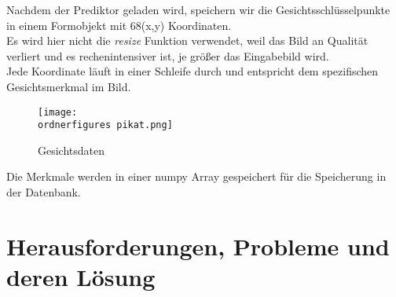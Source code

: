 \begin{flushleft}
Nachdem der Prediktor geladen wird, speichern wir die Gesichtsschlüsselpunkte in einem Formobjekt
mit 68(x,y) Koordinaten. \\
Es wird hier nicht die \textit{resize} Funktion verwendet, weil das Bild an Qualität verliert
und es rechenintensiver ist, je größer das Eingabebild wird. \\
Jede Koordinate läuft in einer Schleife durch und entspricht dem spezifischen
Gesichtsmerkmal im Bild.  \\
\begin{figure}[H]
	\texttt{[image: \\ordnerfigures pikat.png]}
	\centering
	\caption{Gesichtsdaten}
\end{figure}


Die Merkmale werden in einer numpy Array gespeichert für die
Speicherung in der Datenbank. \\

\end{flushleft}

\section{Herausforderungen, Probleme und deren Lösung }

